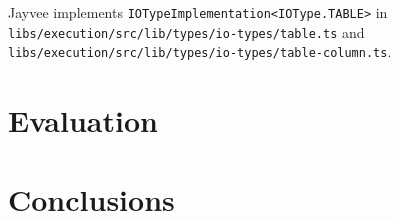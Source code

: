 Jayvee implements \texttt{IOTypeImplementation<IOType.TABLE>} in \texttt{libs/execution/src/lib/types/io-types/table.ts} and \texttt{libs/execution/src/lib/types/io-types/table-column.ts}.

\chapter{Evaluation}
\label{chapter:Evaluation}

\chapter{Conclusions}
\label{chapter:Conclusions}

